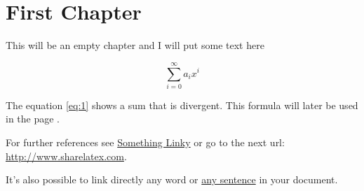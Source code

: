 \documentclass{book}
\begin{document}
\tableofcontents

\chapter{First Chapter}

This will be an empty chapter and I will put some text here

\begin{equation}
\label{eq:1}
\sum_{i=0}^{\infty} a_i x^i
\end{equation}

The equation \ref{eq:1} shows a sum that is divergent. This formula 
will later be used in the page \pageref{second}.

For further references see \href{http://www.sharelatex.com}{Something 
Linky} or go to the next url: \url{http://www.sharelatex.com}.

It's also possible to link directly any word or 
\hyperlink{thesentence}{any sentence} in your document.
\end{document}
